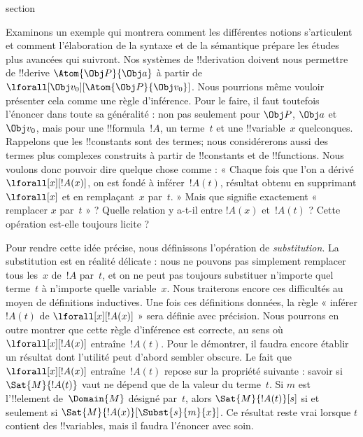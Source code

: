 \documentclass[11pt,a4paper,openany]{memoir}
\begin{document}
\endgroup



\begingroup
\expandafter\def\csname ol@sectioncs\endcsname{section}
\def\olfilename{substitution}




Examinons un exemple qui montrera comment les différentes notions
s'articulent et comment l'élaboration de la syntaxe et de la sémantique
prépare les études plus avancées qui suivront. Nos systèmes de
!!{derivation} doivent nous permettre de !!{derive}
$\Atom{\Obj P}{\Obj a}$ à partir de
$\lforall[\Obj v_0][\Atom{\Obj P}{\Obj v_0}]$. Nous pourrions même
vouloir présenter cela comme une règle d'inférence. Pour le faire, il
faut toutefois l'énoncer dans toute sa généralité : non pas seulement
pour $\Obj P$, $\Obj a$ et $\Obj v_0$, mais pour une
!!{formula}~$!A$, un terme~$t$ et une !!{variable}~$x$ quelconques.
Rappelons que les !!{constant}s sont des termes; nous considérerons
aussi des termes plus complexes construits à partir de !!{constant}s
et de !!{function}s. Nous voulons donc pouvoir dire quelque chose
comme : « Chaque fois que l'on a dérivé
$\lforall[x][!A(x)]$, on est fondé à inférer~$!A(t)$, résultat obtenu
en supprimant $\lforall[x]$ et en remplaçant~$x$ par~$t$. » Mais que
signifie exactement « remplacer $x$ par~$t$ » ? Quelle relation y
a-t-il entre $!A(x)$ et~$!A(t)$ ? Cette opération est-elle toujours
licite ?

Pour rendre cette idée précise, nous définissons l'opération de
\emph{substitution}. La substitution est en réalité délicate : nous ne
pouvons pas simplement remplacer tous les~$x$ de~$!A$ par~$t$, et
on ne peut pas toujours substituer n'importe quel terme~$t$ à
n'importe quelle variable~$x$. Nous traiterons encore ces difficultés
au moyen de définitions inductives. Une fois ces définitions données,
la règle « inférer $!A(t)$ de $\lforall[x][!A(x)]$ » sera définie avec
précision. Nous pourrons en outre montrer que cette règle d'inférence
est correcte, au sens où $\lforall[x][!A(x)]$ entraîne~$!A(t)$. Pour le
démontrer, il faudra encore établir un résultat dont l'utilité peut
d'abord sembler obscure. Le fait que $\lforall[x][!A(x)]$
entraîne~$!A(t)$ repose sur la propriété suivante : savoir si
$\Sat{M}{!A(t)}$ vaut ne dépend que de la valeur du terme~$t$. Si $m$
est l'!!{element} de~$\Domain{M}$
désigné par~$t$, alors
$\Sat{M}{!A(t)}[s]$ si et seulement si
$\Sat{M}{!A(x)}[\Subst{s}{m}{x}]$. Ce résultat reste vrai lorsque $t$
contient des !!{variable}s, mais il faudra l'énoncer avec soin.
\end{document}
